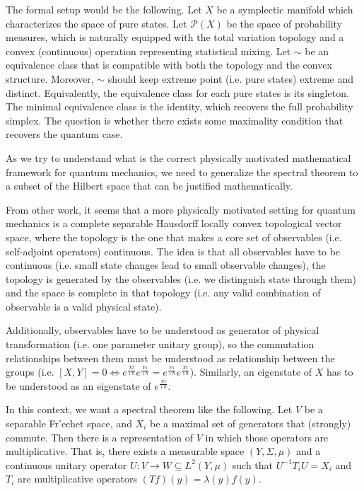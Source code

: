 The formal setup would be the following. Let $X$ be a symplectic manifold which characterizes the space of pure states. Let $\mathcal{P}(X)$ be the space of probability measures, which is naturally equipped with the total variation topology and a convex (continuous) operation representing statistical mixing. Let $\sim$ be an equivalence class that is compatible with both the topology and the convex structure. Moreover, $\sim$ should keep extreme point (i.e. pure states) extreme and distinct. Equivalently, the equivalence class for each pure states is its singleton. The minimal equivalence class is the identity, which recovers the full probability simplex. The question is whether there exists some maximality condition that recovers the quantum case.

{As we try to understand what is the correct physically motivated mathematical framework for quantum mechanics, we need to generalize the spectral theorem to a subset of the Hilbert space that can be justified mathematically.}

From other work, it seems that a more physically motivated setting for quantum mechanics is a complete separable Hausdorff locally convex topological vector space, where the topology is the one that makes a core set of observables (i.e. self-adjoint operators) continuous. The idea is that all observables have to be continuous (i.e. small state changes lead to small observable changes), the topology is generated by the observables (i.e. we distinguish state through them) and the space is complete in that topology (i.e. any valid combination of observable is a valid physical state).

Additionally, observables have to be understood as generator of physical transformation (i.e. one parameter unitary group), so the commutation relationships between them must be understood as relationship between the groups (i.e. $[X,Y] = 0 \iff e^{\frac{Xt}{\imath\hbar}}e^{\frac{Ys}{\imath\hbar}}=e^{\frac{Ys}{\imath\hbar}}e^{\frac{Xt}{\imath\hbar}}$). Similarly, an eigenstate of $X$ has to be understood as an eigenstate of $e^{\frac{Xt}{\imath\hbar}}$.

In this context, we want a spectral theorem like the following. Let $V$ be a separable Fr'{e}chet space, and $X_i$ be a maximal set of generators that (strongly) commute. Then there is a representation of $V$ in which those operators are multiplicative. That is, there exists a measurable space $(Y, \Sigma, \mu)$ and a continuous unitary operator $U :  V \to W \subseteq L^2(Y,\mu)$ such that $U^{-1}T_iU = X_i$ and $T_i$ are multiplicative operators $(Tf)(y)=\lambda(y)f(y)$.

